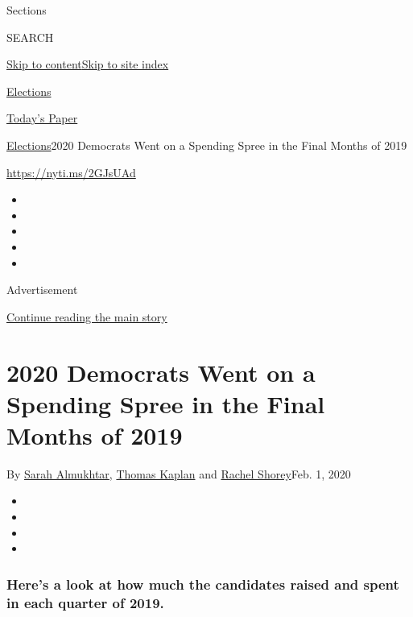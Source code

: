 Sections

SEARCH

\protect\hyperlink{site-content}{Skip to
content}\protect\hyperlink{site-index}{Skip to site index}

\href{https://www.nytimes.com/news-event/2020-election}{Elections}

\href{https://myaccount.nytimes.com/auth/login?response_type=cookie\&client_id=vi}{}

\href{https://www.nytimes.com/section/todayspaper}{Today's Paper}

\href{/news-event/2020-election}{Elections}\textbar{}2020 Democrats Went
on a Spending Spree in the Final Months of 2019

\url{https://nyti.ms/2GJsUAd}

\begin{itemize}
\item
\item
\item
\item
\item
\end{itemize}

Advertisement

\protect\hyperlink{after-top}{Continue reading the main story}

\hypertarget{2020-democrats-went-on-a-spending-spree-in-the-final-months-of-2019}{%
\section{2020 Democrats Went on a Spending Spree in the Final Months of
2019}\label{2020-democrats-went-on-a-spending-spree-in-the-final-months-of-2019}}

By \href{https://www.nytimes.com/by/sarah-almukhtar}{Sarah Almukhtar},
\href{https://www.nytimes.com/by/thomas-kaplan}{Thomas Kaplan} and
\href{https://www.nytimes.com/by/rachel-shorey}{Rachel Shorey}Feb. 1,
2020

\begin{itemize}
\item
\item
\item
\item
\end{itemize}

\hypertarget{heres-a-look-at-how-much-the-candidates-raised-and-spent-in-each-quarter-of-2019}{%
\subsubsection{Here's a look at how much the candidates raised and spent
in each quarter of
2019.}\label{heres-a-look-at-how-much-the-candidates-raised-and-spent-in-each-quarter-of-2019}}

